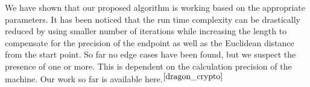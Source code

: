 \documentclass[cryptography,article,submit,moreauthors,pdftex]{Definitions/mdpi}
\begin{document}
\begin{flushleft}
    We have shown that our proposed algorithm is working based on the appropriate parameters. It has been noticed that the run time complexity can be drastically reduced by using smaller number of iterations while increasing the length to compensate for the precision of the endpoint as well as the Euclidean distance from the start point. So far no edge cases have been found, but we suspect the presence of one or more. This is dependent on the calculation precision of the machine. Our work so far is available here.$^{\cite{dragon_crypto}}$
\end{flushleft}

\vspace{6pt} 








\end{document}
